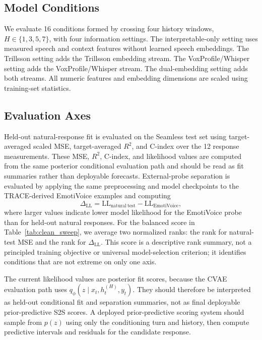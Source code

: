 \documentclass[conference]{IEEEtran}
\begin{document}
\subsection{Model Conditions}
We evaluate 16 conditions formed by crossing four history windows, $H\in\{1,3,5,7\}$, with four information settings.
The interpretable-only setting uses measured speech and context features without learned speech embeddings.
The Trillsson setting adds the Trillsson embedding stream.
The VoxProfile/Whisper setting adds the VoxProfile/Whisper stream.
The dual-embedding setting adds both streams.
All numeric features and embedding dimensions are scaled using training-set statistics.

\subsection{Evaluation Axes}
Held-out natural-response fit is evaluated on the Seamless test set using target-averaged scaled MSE, target-averaged $R^2$, and C-index over the 12 response measurements.
These MSE, $R^2$, C-index, and likelihood values are computed from the same posterior conditional evaluation path and should be read as fit summaries rather than deployable forecasts.
External-probe separation is evaluated by applying the same preprocessing and model checkpoints to the TRACE-derived EmotiVoice examples and computing
\begin{equation}
    \Delta_{\mathrm{LL}} =
    \mathrm{LL}_{\mathrm{natural\ test}} -
    \mathrm{LL}_{\mathrm{EmotiVoice}},
\end{equation}
where larger values indicate lower model likelihood for the EmotiVoice probe than for held-out natural responses.
For the balanced score in Table~\ref{tab:clean_sweep}, we average two normalized ranks: the rank for natural-test MSE and the rank for $\Delta_{\mathrm{LL}}$.
This score is a descriptive rank summary, not a principled training objective or universal model-selection criterion; it identifies conditions that are not extreme on only one axis.

The current likelihood values are posterior fit scores, because the CVAE evaluation path uses $q_{\phi}(z \mid x_t,h_t^{(H)},y_t)$.
They should therefore be interpreted as held-out conditional fit and separation summaries, not as final deployable prior-predictive S2S scores.
A deployed prior-predictive scoring system should sample from $p(z)$ using only the conditioning turn and history, then compute predictive intervals and residuals for the candidate response.
\end{document}
